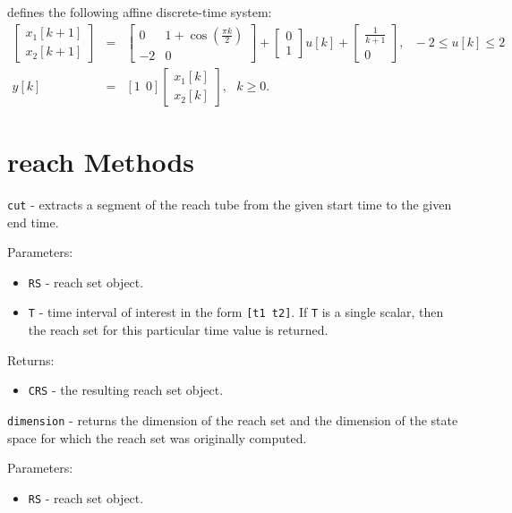 \documentclass{report}
\begin{document}
defines the following affine discrete-time system:
\begin{eqnarray*}
\left[\begin{array}{c}
x_1[k+1]\\
x_2[k+1]\end{array}\right] & = & \left[\begin{array}{cc}
0 & 1 + \cos(\frac{\pi k}{2})\\
-2 & 0\end{array}\right] + \left[\begin{array}{c}
0\\
1\end{array}\right]u[k] + \left[\begin{array}{c}
\frac{1}{k+1}\\
0\end{array}\right], ~~~ -2\leq u[k]\leq2\\
y[k] & = & [1 ~~ 0]\left[\begin{array}{c}
x_1[k]\\
x_2[k]\end{array}\right], ~~~ k\geq0.
\end{eqnarray*}

\newpage

\section{reach Methods}
{\Large {\tt cut}} - extracts a segment of the reach tube from the given start
time to the given end time.

Parameters:
\begin{itemize}
\item {\tt RS} - reach set object.
\item {\tt T} - time interval of interest in the form {\tt [t1 t2]}.
If {\tt T} is a single scalar, then the reach set for this particular time
value is returned.
\end{itemize}

Returns:
\begin{itemize}
\item {\tt CRS} - the resulting reach set object.
\end{itemize}

\newpage

{\Large {\tt dimension}} - returns the dimension of the reach set and
the dimension of the state space for which the reach set was originally
computed.

Parameters:
\begin{itemize}
\item {\tt RS} - reach set object.
\end{itemize}
\end{document}
